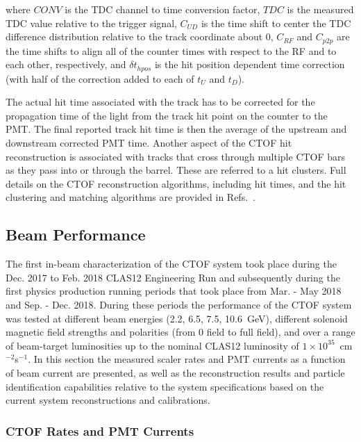 \documentclass[3p,times,twocolumn]{elsarticle}
\begin{document}
\noindent
where $CONV$ is the TDC channel to time conversion factor, $TDC$ is the measured TDC value relative
to the trigger signal, $C_{UD}$ is the time shift to center the TDC difference distribution relative to the
track coordinate about 0, $C_{RF}$ and $C_{p2p}$ are the time shifts to align all of the counter times
with respect to the RF and to each other, respectively, and $\delta t_{hpos}$ is the hit position dependent
time correction (with half of the correction added to each of $t_U$ and $t_D$).

The actual hit time associated with the track has to be corrected for the propagation time of the light from
the track hit point on the counter to the PMT. The final reported track hit time is then the average of
the upstream and downstream corrected PMT time. Another aspect of the CTOF hit reconstruction is associated
with tracks that cross through multiple CTOF bars as they pass into or through the barrel. These are referred
to a hit clusters. Full details on the CTOF reconstruction algorithms, including hit times, and the hit clustering
and matching algorithms are provided in Refs.~\cite{recon-nim,ctof-recon}.

\subsection{Beam Performance}  
\label{sec:beam}

The first in-beam characterization of the CTOF system took place during the Dec. 2017 to Feb. 2018
CLAS12 Engineering Run and subsequently during the first physics production running periods that took place
from Mar. - May 2018 and Sep. - Dec. 2018. During these periods the performance of the CTOF system was
tested at different beam energies (2.2, 6.5, 7.5, 10.6~GeV), different solenoid magnetic field strengths and
polarities (from 0 field to full field), and over a range of beam-target luminosities up to the nominal CLAS12
luminosity of $1 \times 10^{35}$~cm$^{-2}$s$^{-1}$. In this section the measured scaler rates and PMT currents
as a function of beam current are presented, as well as the reconstruction results and particle identification
capabilities relative to the system specifications based on the current system reconstructions and calibrations.

\subsubsection{CTOF Rates and PMT Currents}
\end{document}
